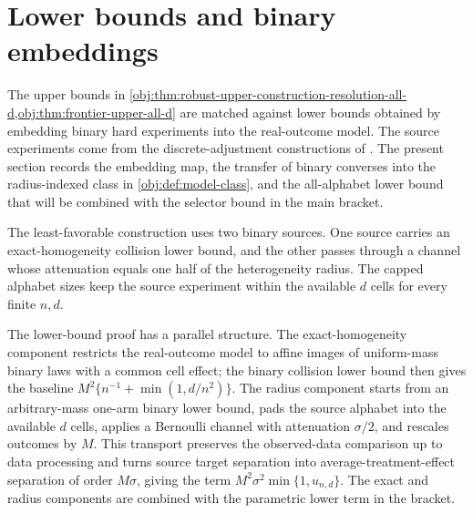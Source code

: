 \section{Lower bounds and binary embeddings}

The upper bounds in \cref{obj:thm:robust-upper-construction-resolution-all-d,obj:thm:frontier-upper-all-d} are matched against lower bounds obtained by embedding binary hard experiments into the real-outcome model. The source experiments come from the discrete-adjustment constructions of \citet{ZengBalakrishnanHanKennedy2024}. The present section records the embedding map, the transfer of binary converses into the radius-indexed class in \cref{obj:def:model-class}, and the all-alphabet lower bound that will be combined with the selector bound in the main bracket.

The least-favorable construction uses two binary sources. One source carries an exact-homogeneity collision lower bound, and the other passes through a channel whose attenuation equals one half of the heterogeneity radius. The capped alphabet sizes keep the source experiment within the available \(d\) cells for every finite \(n,d\).

The lower-bound proof has a parallel structure. The exact-homogeneity component restricts the real-outcome model to affine images of uniform-mass binary laws with a common cell effect; the binary collision lower bound then gives the baseline \(M^2\{n^{-1}+\min(1,d/n^2)\}\). The radius component starts from an arbitrary-mass one-arm binary lower bound, pads the source alphabet into the available \(d\) cells, applies a Bernoulli channel with attenuation \(\sigma/2\), and rescales outcomes by \(M\). This transport preserves the observed-data comparison up to data processing and turns source target separation into average-treatment-effect separation of order \(M\sigma\), giving the term \(M^2\sigma^2\min\{1,u_{n,d}\}\). The exact and radius components are combined with the parametric lower term in the bracket.

